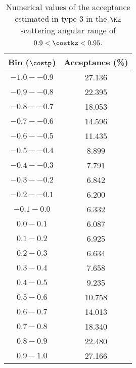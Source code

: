 \begin{table}[!h] 
  \begin{center}
  \caption{Numerical values of the acceptance estimated in type 3 in the $\Kz$ scattering angular range of \textbf{$0.9<\costkz<0.95$}.}
  \centering
  \begin{threeparttable}
    \begin{tabular}{cc}
    Bin ($\costp$) & Acceptance (\%) \\
    \midrule\midrule
    $-1.0 - -0.9$ & 27.136 \\
    \midrule
    $-0.9 - -0.8$ & 22.395 \\
    \midrule
    $-0.8 - -0.7$ & 18.053 \\
    \midrule
    $-0.7 - -0.6$ & 14.596 \\
    \midrule
    $-0.6 - -0.5$ & 11.435 \\
    \midrule
    $-0.5 - -0.4$ & 8.899 \\
    \midrule
    $-0.4 - -0.3$ & 7.791 \\
    \midrule
    $-0.3 - -0.2$ & 6.842 \\
    \midrule
    $-0.2 - -0.1$ & 6.200 \\
    \midrule
    $-0.1 - 0.0$ & 6.332 \\
    \midrule
    $0.0 - 0.1$ & 6.087 \\
    \midrule
    $0.1 - 0.2$ & 6.925 \\
    \midrule
    $0.2 - 0.3$ & 6.634 \\
    \midrule
    $0.3 - 0.4$ & 7.658 \\
    \midrule
    $0.4 - 0.5$ & 9.235 \\
    \midrule
    $0.5 - 0.6$ & 10.758 \\
    \midrule
    $0.6 - 0.7$ & 14.013 \\
    \midrule
    $0.7 - 0.8$ & 18.340 \\
    \midrule
    $0.8 - 0.9$ & 22.480 \\
    \midrule
    $0.9 - 1.0$ & 27.166 \\
    \end{tabular}
  \end{threeparttable}
  \label{tab-Pl-acc_38}
  \end{center}
\end{table}

